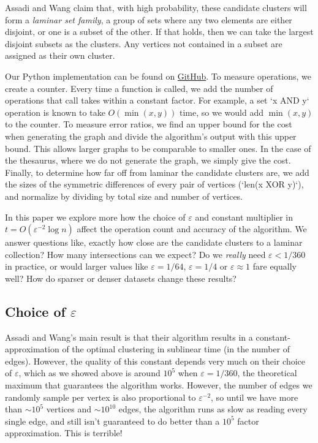 \documentclass[
]{article}
\begin{document}
Assadi and Wang claim that, with high probability, these candidate clusters will form a
\emph{laminar set family}, a group of sets where any two elements are either disjoint,
or one is a subset of the other.
If that holds, then we can take the largest disjoint subsets as the clusters.
Any vertices not contained in a subset are assigned as their own cluster.

Our Python implementation can be found on \href{https://github.com/cooljoseph1/Clustering-Algorithm-Implementation}{GitHub}. To measure operations, we create a counter. Every time a function is called, we add the number of operations that call takes within a constant factor. For example, a set `x AND y` operation is known to take $O(\min(x, y))$ time, so we would add $\min(x, y)$ to the counter. To measure error ratios, we find an upper bound for the cost when generating the graph and divide the algorithm's output with this upper bound. This allows larger graphs to be comparable to smaller ones. In the case of the thesaurus, where we do not generate the graph, we simply give the cost. Finally, to determine how far off from laminar the candidate clusters are, we add the sizes of the symmetric differences of every pair of vertices (`len(x XOR y)`), and normalize by dividing by total size and number of vertices.

In this paper we explore more how the choice of {\(\varepsilon\)} and
constant multiplier in {\(t = O(\varepsilon^{- 2}\log n)\)} affect the
operation count and accuracy of the algorithm. We answer questions like,
exactly how close are the candidate clusters to a laminar collection?
How many intersections can we expect? Do we \emph{really} need
  {\(\varepsilon < 1/360\)} in practice, or would larger values like
  {\(\varepsilon = 1/64\)}, {\(\varepsilon = 1/4\)} or
  {\(\varepsilon \approx 1\)} fare equally well? How do sparser or denser
datasets change these results?

\hypertarget{choice-of-varepsilon}{%
  \subsection{\texorpdfstring{Choice of
        {\(\varepsilon\)}}{Choice of \textbackslash varepsilon}}\label{choice-of-varepsilon}}

Assadi and Wang's main result is that their algorithm
results in a constant-approximation of the optimal clustering in
sublinear time (in the number of edges). However, the quality of this constant depends very much
on their choice of {\(\varepsilon\)}, which as we showed above is around $10^5$ when $\varepsilon = 1/360$, the theoretical maximum that guarantees the algorithm works. However, the number of edges we randomly sample per vertex is also proportional to $\varepsilon^{-2}$, so until we have more than $\sim 10^{5}$ vertices and $\sim 10^{10}$ edges, the algorithm runs as slow as reading every single edge, and still isn't guaranteed to do better than a $10^5$ factor approximation. This is terrible!
\end{document}
